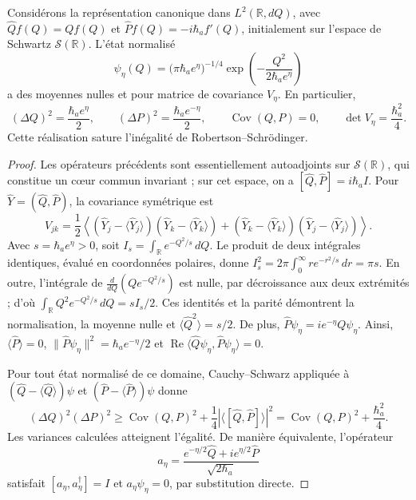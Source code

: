 \begin{proposition}
\label{md:antmem:covarianza-gaussiana}
Considérons la représentation canonique dans \(L^2(\mathbb R,dQ)\), avec
\(\widehat Qf(Q)=Qf(Q)\) et
\(\widehat Pf(Q)=-i\hbar_a f'(Q)\), initialement sur l'espace de
Schwartz \(\mathcal S(\mathbb R)\). L'état normalisé
\begin{equation}
 \psi_\eta(Q)=\bigl(\pi\hbar_a e^\eta\bigr)^{-1/4}
 \exp\!\left(-\frac{Q^2}{2\hbar_a e^\eta}\right)
 \label{md:antmem:gaussiana-accion}
\end{equation}
a des moyennes nulles et pour matrice de covariance \(V_\eta\). En particulier,
\begin{equation}
 (\Delta Q)^2=\frac{\hbar_a e^\eta}{2},\qquad
 (\Delta P)^2=\frac{\hbar_a e^{-\eta}}{2},\qquad
 \operatorname{Cov}(Q,P)=0,\qquad
 \det V_\eta=\frac{\hbar_a^2}{4}.
 \label{md:antmem:varianzas-accion}
\end{equation}
Cette réalisation sature l'inégalité de Robertson--Schrödinger.
\end{proposition}

\begin{proof}
Les opérateurs précédents sont essentiellement autoadjoints sur
\(\mathcal S(\mathbb R)\), qui constitue un cœur commun invariant ;
sur cet espace, on a
\([\widehat Q,\widehat P]=i\hbar_a I\). Pour
\(\widehat Y=(\widehat Q,\widehat P)\), la covariance symétrique est
\[
 V_{jk}=\frac12\left\langle
 (\widehat Y_j-\langle\widehat Y_j\rangle)
 (\widehat Y_k-\langle\widehat Y_k\rangle)
 +(\widehat Y_k-\langle\widehat Y_k\rangle)
 (\widehat Y_j-\langle\widehat Y_j\rangle)
 \right\rangle.
\]
Avec \(s=\hbar_a e^\eta>0\), soit
\(I_s=\int_{\mathbb R}e^{-Q^2/s}\,dQ\). Le produit de deux
intégrales identiques, évalué en coordonnées polaires, donne
\(I_s^2=2\pi\int_0^\infty r e^{-r^2/s}\,dr=\pi s\).
En outre, l'intégrale de
\(\frac{d}{dQ}(Qe^{-Q^2/s})\) est nulle, par décroissance aux deux
extrémités ; d'où
\(\int_{\mathbb R}Q^2e^{-Q^2/s}\,dQ=sI_s/2\).
Ces identités et la parité démontrent la normalisation, la moyenne nulle et
\(\langle\widehat Q^2\rangle=s/2\). De plus,
\(\widehat P\psi_\eta=i e^{-\eta}Q\psi_\eta\).
Ainsi, \(\langle\widehat P\rangle=0\),
\(\|\widehat P\psi_\eta\|^2=\hbar_a e^{-\eta}/2\) et
\(\operatorname{Re}\langle\widehat Q\psi_\eta,
\widehat P\psi_\eta\rangle=0\).

Pour tout état normalisé de ce domaine, Cauchy--Schwarz appliquée
à \((\widehat Q-\langle\widehat Q\rangle)\psi\) et
\((\widehat P-\langle\widehat P\rangle)\psi\) donne
\[
 (\Delta Q)^2(\Delta P)^2
 \geq \operatorname{Cov}(Q,P)^2
       +\frac14\left|\langle[\widehat Q,\widehat P]\rangle\right|^2
 =\operatorname{Cov}(Q,P)^2+\frac{\hbar_a^2}{4}.
\]
Les variances calculées atteignent l'égalité. De manière équivalente,
l'opérateur
\[
 a_\eta=\frac{e^{-\eta/2}\widehat Q
                  +i e^{\eta/2}\widehat P}{\sqrt{2\hbar_a}}
\]
satisfait \([a_\eta,a_\eta^\dagger]=I\) et
\(a_\eta\psi_\eta=0\), par substitution directe.
\end{proof}

